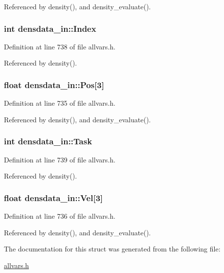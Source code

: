 Referenced by density(), and density\_\-evaluate().

\hypertarget{structdensdata__in_a1c79a4d4fdcc9e483946193f2d030308}{
\subsubsection[{Index}]{\setlength{\rightskip}{0pt plus 5cm}int {\bf densdata\_\-in::Index}}}
\label{structdensdata__in_a1c79a4d4fdcc9e483946193f2d030308}


Definition at line 738 of file allvars.h.



Referenced by density().

\hypertarget{structdensdata__in_a619b6e6d76f91b047119249915527164}{
\subsubsection[{Pos}]{\setlength{\rightskip}{0pt plus 5cm}float {\bf densdata\_\-in::Pos}\mbox{[}3\mbox{]}}}
\label{structdensdata__in_a619b6e6d76f91b047119249915527164}


Definition at line 735 of file allvars.h.



Referenced by density(), and density\_\-evaluate().

\hypertarget{structdensdata__in_a010be125c58096f5cd2fec47f210747b}{
\subsubsection[{Task}]{\setlength{\rightskip}{0pt plus 5cm}int {\bf densdata\_\-in::Task}}}
\label{structdensdata__in_a010be125c58096f5cd2fec47f210747b}


Definition at line 739 of file allvars.h.



Referenced by density().

\hypertarget{structdensdata__in_a8df7f2cfb255b800bbbbb69d674ae4ac}{
\subsubsection[{Vel}]{\setlength{\rightskip}{0pt plus 5cm}float {\bf densdata\_\-in::Vel}\mbox{[}3\mbox{]}}}
\label{structdensdata__in_a8df7f2cfb255b800bbbbb69d674ae4ac}


Definition at line 736 of file allvars.h.



Referenced by density(), and density\_\-evaluate().



The documentation for this struct was generated from the following file:\begin{DoxyCompactItemize}
\item 
\hyperlink{allvars_8h}{allvars.h}\end{DoxyCompactItemize}
